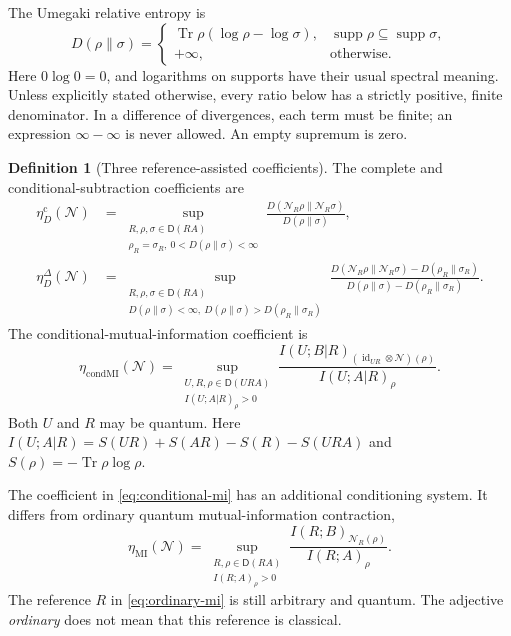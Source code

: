 \documentclass[11pt]{article}
\numberwithin{equation}{section}
\theoremstyle{definition}
\newtheorem{definition}[theorem]{Definition}
\theoremstyle{remark}
\DeclareMathOperator{\Tr}{Tr}
\DeclareMathOperator{\supp}{supp}
\DeclareMathOperator{\id}{id}
\newcommand{\N}{\mathcal N}
\newcommand{\etaC}{\eta_D^{\mathrm c}}
\newcommand{\etaDel}{\eta_D^{\Delta}}
\newcommand{\etaCM}{\eta_{\mathrm{condMI}}}
\newcommand{\etaMI}{\eta_{\mathrm{MI}}}
\newcommand{\States}{\mathsf D}
\begin{document}
The Umegaki relative entropy is
\[
 D(\rho\|\sigma)=
 \begin{cases}
 \Tr\rho(\log\rho-\log\sigma),&\supp\rho\subseteq\supp\sigma,\\
 +\infty,&\text{otherwise}.
 \end{cases}
\]
Here $0\log0=0$, and logarithms on supports have their usual spectral meaning.
Unless explicitly stated otherwise, every ratio below has a strictly positive,
finite denominator. In a difference of divergences, each term must be finite;
an expression $\infty-\infty$ is never allowed. An empty supremum is zero.

\begin{definition}[Three reference-assisted coefficients]
\label{def:coefficients}
The complete and conditional-subtraction coefficients are
\begin{align}
 \etaC(\N)
 &=\sup_{\substack{R,\rho,\sigma\in\States(RA)\\
                   \rho_R=\sigma_R,\ 0<D(\rho\|\sigma)<\infty}}
       \frac{D(\N_R\rho\|\N_R\sigma)}{D(\rho\|\sigma)}, \label{eq:complete}\\
 \etaDel(\N)
 &=\sup_{\substack{R,\rho,\sigma\in\States(RA)\\
     D(\rho\|\sigma)<\infty,\ D(\rho\|\sigma)>D(\rho_R\|\sigma_R)}}
 \frac{D(\N_R\rho\|\N_R\sigma)-D(\rho_R\|\sigma_R)}
      {D(\rho\|\sigma)-D(\rho_R\|\sigma_R)}. \label{eq:conditional}
\end{align}
The conditional-mutual-information coefficient is
\begin{equation}
 \etaCM(\N)=
 \sup_{\substack{U,R,\rho\in\States(URA)\\ I(U;A|R)_\rho>0}}
 \frac{I(U;B|R)_{(\id_{UR}\otimes\N)(\rho)}}{I(U;A|R)_\rho}.
 \label{eq:conditional-mi}
\end{equation}
Both $U$ and $R$ may be quantum. Here
$I(U;A|R)=S(UR)+S(AR)-S(R)-S(URA)$ and $S(\rho)=-\Tr\rho\log\rho$.
\end{definition}

The coefficient in \eqref{eq:conditional-mi} has an additional conditioning
system. It differs from ordinary quantum mutual-information contraction,
\begin{equation}
 \etaMI(\N)=
 \sup_{\substack{R,\rho\in\States(RA)\\ I(R;A)_\rho>0}}
       \frac{I(R;B)_{\N_R(\rho)}}{I(R;A)_\rho}.
 \label{eq:ordinary-mi}
\end{equation}
The reference $R$ in \eqref{eq:ordinary-mi} is still arbitrary and quantum.
The adjective \emph{ordinary} does not mean that this reference is classical.
\end{document}
